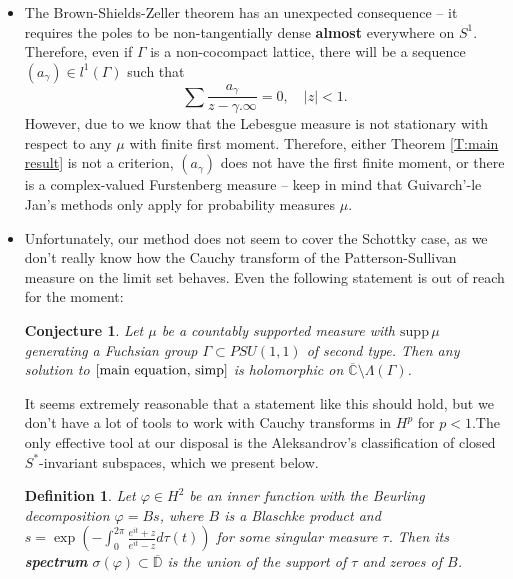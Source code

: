 \documentclass[11pt]{article}
\newtheorem{definition}{Definition}[section]
\newtheorem{conjecture}{Conjecture}[section]
\begin{document}
\begin{itemize}
	The Douglas-Shields-Shapiro theorem implies that any holomorphic function with the radius of convergence exceeding $1$ is either cyclic with respect to the backward shift or rational. It is reasonable to assume that \eqref{main equation, simp} only has rational solutions when $\mu$ is supported on a single element, and we conjecture that former never happens.
	\item The Brown-Shields-Zeller theorem has an unexpected consequence -- it requires the poles to be non-tangentially dense \textbf{almost} everywhere on $S^1$. Therefore, even if $\Gamma$ is a non-cocompact lattice, there will be a sequence $(a_\gamma) \in l^1(\Gamma)$ such that
	\[
	\sum \frac{a_\gamma}{z - \gamma.\infty} = 0, \quad |z| < 1.
	\]
	However, due to \cite{guivarch1990} we know that the Lebesgue measure is not stationary with respect to any $\mu$ with finite first moment. Therefore, either Theorem \ref{T:main result} is not a criterion, $(a_\gamma)$ does not have the first finite moment, or there is a complex-valued Furstenberg measure -- keep in mind that Guivarch'-le Jan's methods only apply for probability measures $\mu$.
	\item Unfortunately, our method does not seem to cover the Schottky case, as we don't really know how the Cauchy transform of the Patterson-Sullivan measure on the limit set behaves. Even the following statement is out of reach for the moment:
	\begin{conjecture}
		Let $\mu$ be a countably supported measure with $\text{supp} \, \mu$ generating a Fuchsian group $\Gamma \subset PSU(1,1)$ of second type. Then any solution to $\ref{main equation, simp}$ is holomorphic on $\overline{\mathbb{C}} \setminus \Lambda(\Gamma)$. 
	\end{conjecture}
	It seems extremely reasonable that a statement like this should hold, but we don't have a lot of tools to work with Cauchy transforms in $H^p$ for $p < 1$.The only effective tool at our disposal is the Aleksandrov's classification of closed $S^*$-invariant subspaces, which we present below.
	
	\begin{definition}
		Let $\varphi \in H^2$ be an inner function with the Beurling decomposition $\varphi = Bs$, where $B$ is a Blaschke product and $s = \exp\left( -  \int_0^{2\pi} \frac{e^{it} + z}{e^{it} - z} d\tau(t) \right)$ for some singular measure $\tau$. Then its \textbf{spectrum} $\sigma(\varphi) \subset \overline{\mathbb{D}}$ is the union of the support of $\tau$ and zeroes of $B$. 
	\end{definition}
	

\end{itemize}
\end{document}
